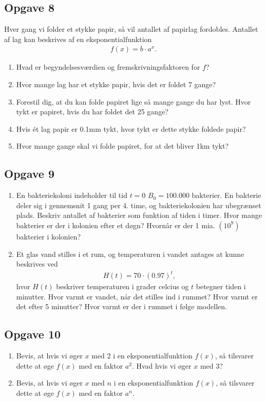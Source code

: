 \subsection*{Opgave 8}
Hver gang vi folder et stykke papir, så vil antallet af papirlag fordobles. Antallet af lag kan beskrives af en eksponentialfunktion 
\begin{align*}
	f(x) = b\cdot a^x.
\end{align*}
\begin{enumerate}[label=\roman*)]
	\item Hvad er begyndelsesværdien og fremskrivningsfaktoren for $f$?
	\item Hvor mange lag har et stykke papir, hvis det er foldet 7 gange?
	\item Forestil dig, at du kan folde papiret lige så mange gange du har lyst. Hvor tykt er
	papiret, hvis du har foldet det 25 gange?
 	\item Hvis ét lag papir er 0.1mm tykt, hvor tykt er dette stykke foldede papir?
	\item Hvor mange gange skal vi folde papiret, for at det bliver 1km tykt?
\end{enumerate}


\subsection*{Opgave 9}
\begin{enumerate}[label=\roman*)]
\item En bakteriekoloni indeholder til tid $t=0$ $B_0 = 100.000$ bakterier. En bakterie deler sig i gennemsnit 1 gang per 4. time, og bakteriekolonien har ubegrænset plads. Beskriv antallet af bakterier som funktion af tiden i timer. Hvor mange bakterier er der i kolonien efter et døgn? Hvornår er der 1 mia. $(10^9)$ bakterier i kolonien?
\item Et glas vand stilles i et rum, og temperaturen i vandet antages at kunne beskrives ved
\begin{align*}
H(t) = 70\cdot(0.97)^t,
\end{align*}
hvor $H(t)$ beskriver temperaturen i grader celcius og $t$ betegner tiden i minutter. Hvor varmt er vandet, når det stilles ind i rummet? Hvor varmt er det efter 5 minutter? Hvor varmt er der i rummet i følge modellen. 
\end{enumerate}

\subsection*{Opgave 10}
\begin{enumerate}[label=\roman*)]
\item Bevis, at hvis vi øger $x$ med 2 i en eksponentialfunktion $f(x)$, så tilsvarer dette at øge $f(x)$ med en faktor $a^2$. Hvad hvis vi øger $x$ med $3$?
\item Bevis, at hvis vi øger $x$ med $n$ i en eksponentialfunktion $f(x)$, så tilsvarer dette at øge $f(x)$ med en faktor $a^n$.
\end{enumerate}
